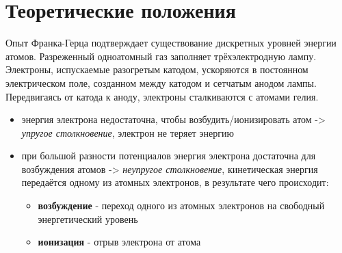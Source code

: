\documentclass[a4paper]{article}
\begin{document}
\section{Теоретические положения}
Опыт Франка-Герца подтверждает существование дискретных уровней энергии атомов. Разреженный одноатомный газ заполняет трёхэлектродную лампу. Электроны, испускаемые разогретым катодом, ускоряются в постоянном электрическом поле, созданном между катодом и сетчатым анодом лампы. Передвигаясь от катода к аноду, электроны сталкиваются с атомами гелия.
\begin{itemize}
    \item энергия электрона недостаточна, чтобы возбудить/ионизировать атом -> \textit{упругое столкновение}, электрон не теряет энергию
    \item при большой разности потенциалов энергия электрона достаточна для возбуждения атомов -> \textit{неупругое столкновение}, кинетическая энергия передаётся одному из атомных электронов, в результате чего происходит:
    \begin{itemize}
        \item \textbf{возбуждение} - переход одного из атомных электронов на свободный энергетический уровень
        \item \textbf{ионизация} - отрыв электрона от атома 
    \end{itemize}
\end{itemize}
\end{document}
